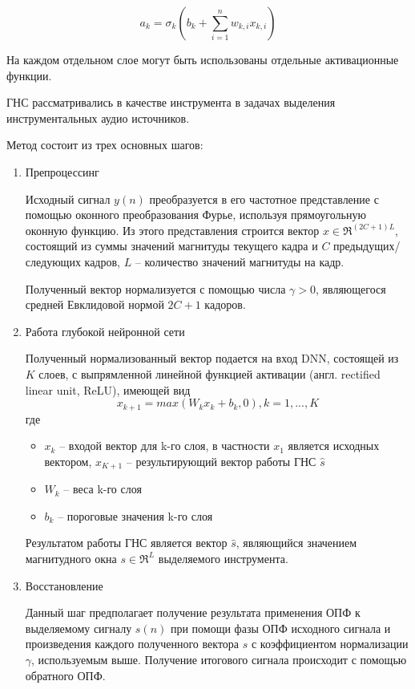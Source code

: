 \begin{equation}
a_k = \sigma_k( b_k + \sum_{i=1}^{n} w_{k,i} x_{k,i} )
\end{equation}

На каждом отдельном слое могут быть использованы отдельные активационные функции.

ГНС рассматривались в качестве инструмента в задачах выделения инструментальных аудио источников\cite{Uhlich}.

Метод состоит из трех основных шагов:

\begin{enumerate}
	\item Препроцессинг
	
	Исходный сигнал $y(n)$ преобразуется в его частотное представление с помощью оконного преобразования Фурье, используя прямоугольную оконную функцию. Из этого представления строится вектор $x \in \Re^{(2C+1)L}$, состоящий из суммы значений магнитуды текущего кадра и $C$ предыдущих/следующих кадров, $L$ -- количество значений магнитуды на кадр.
	
	Полученный вектор нормализуется с помощью числа $\gamma > 0$, являющегося средней Евклидовой нормой $2C+1$ кадоров.
	
	\item Работа глубокой нейронной сети
	
	Полученный нормализованный вектор подается на вход DNN, состоящей из $K$ слоев, с выпрямленной линейной функцией активации (англ. rectified linear unit, ReLU), имеющей вид
	\begin{equation}
	x_{k+1} = max(W_k x_k + b_k , 0), k = 1, ..., K
	\label{anal:relu}
	\end{equation}
	где 
	\begin{itemize}
		\item $x_k$ -- входой вектор для k-го слоя, в частности $x_1$ является исходных вектором, $x_{K+1}$ -- результирующий вектор работы ГНС $\hat s$
		\item $W_k$ -- веса k-го слоя
		\item $b_k$ -- пороговые значения k-го слоя
	\end{itemize}

	Результатом работы ГНС является вектор $\hat s$, являющийся значением магнитудного окна $s \in \Re^L$ выделяемого инструмента.
	
	\item Восстановление
	
	Данный шаг предполагает получение результата применения ОПФ к выделяемому сигналу $s(n)$ при помощи фазы ОПФ исходного сигнала и произведения каждого полученного вектора $\hat{s}$ с коэффициентом нормализации $\gamma$, используемым выше. Получение итогового сигнала происходит с помощью обратного ОПФ.
	
\end{enumerate}

